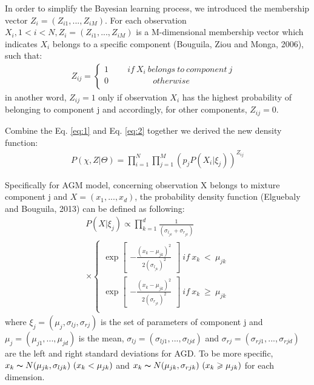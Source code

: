 \documentclass[conference]{IEEEtran}
\begin{document}
In order to simplify the Bayesian learning process, we introduced the membership vector $Z_i=(Z_{i1},...,Z_{iM})$. For each observation $X_i, 1 < i <N, Z_i = (Z_{i1},...,Z_{iM})$ is a M-dimensional membership vector which indicates $X_i$ belongs to a specific component (Bouguila, Ziou and Monga, 2006)\cite{b6}, such that:
\begin{align}
Z_{ij} = \left\{\begin{matrix}
1\ \qquad if\ X_i\ belongs\ to\ component\ j \\
0\ \qquad\quad\qquad otherwise\qquad\qquad\quad\quad \\
\end{matrix}\right.
\label{eq:2}
\end{align}
in another word, $Z_{ij} = 1$ only if observation $X_i$ has the highest probability of belonging to component j and accordingly, for other components, $Z_{ij} = 0$. 

Combine the Eq. \eqref{eq:1} and Eq. \eqref{eq:2} together we derived the new density function:
\begin{align}
P(\chi, Z|\Theta) = \prod_{i=1}^{N}\prod_{j=1}^{M}(p_jP(X_i|\xi_j))^{Z_{ij}}
\label{eq:3}
\end{align}

Specifically for AGM model, concerning observation X belongs to mixture component j and $X = (x_1,...,x_d)$, the probability density function (Elguebaly and Bouguila, 2013)\cite{b1} can be defined as following:
\begin{multline}
P(X|\xi_j) \propto \prod_{k=1}^{d} \frac{1}{(\sigma_{l_{jk}}+\sigma_{r_{jk}})}\\
\times \left\{\begin{matrix}
\exp \begin{bmatrix}
-\frac{(x_k-\mu_{jk})^2}{2(\sigma_{l_{jk}})^2}
\end{bmatrix}\ if\ x_k\ <\ \mu_{jk} \\ 
\exp \begin{bmatrix}
-\frac{(x_k-\mu_{jk})^2}{2(\sigma_{r_{jk}})^2}
\end{bmatrix}\ if\ x_k\ \geqslant\ \mu_{jk} \\ 
\end{matrix}\right.
\label{eq:4}
\end{multline}
where $\xi_j = (\mu_j,\sigma_{lj},\sigma_{rj})$ is the set of parameters of component j and $\mu_j = (\mu_{j1},...,\mu_{jd})$ is the mean, $\sigma_{lj} = (\sigma_{lj1},...,\sigma_{ljd})$ and $\sigma_{rj} = (\sigma_{rj1},...,\sigma_{rjd})$ are the left and right standard deviations for AGD. To be more specific, $x_k \thicksim N(\mu_{jk},\sigma_{ljk})\ (x_k < \mu_{jk})$ and $x_k \thicksim N(\mu_{jk},\sigma_{rjk})\ (x_k \geqslant \mu_{jk})$ for each dimension.
\end{document}
